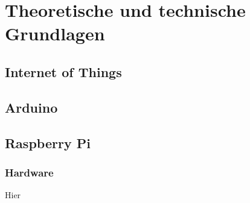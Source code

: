 \chapter{Theoretische und technische Grundlagen}
\section{Internet of Things}
\section{Arduino}
\section{Raspberry Pi}
\subsection{Hardware}
Hier

